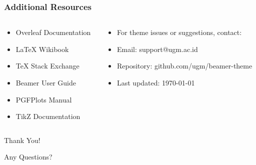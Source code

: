 \documentclass[aspectratio=169,professionalfonts]{beamer}
\begin{document}
\begin{frame}
    \frametitle{Additional Resources}
    
    \begin{columns}[T]
        \begin{column}{0.48\textwidth}
            \begin{tcolorbox}[colback=ugmLightGrey,colframe=ugmBlue,title=LaTeX Resources]
                \begin{itemize}
                    \item Overleaf Documentation
                    \item LaTeX Wikibook
                    \item TeX Stack Exchange
                    \item Beamer User Guide
                    \item PGFPlots Manual
                    \item TikZ Documentation
                \end{itemize}
            \end{tcolorbox}
        \end{column}
        
        \begin{column}{0.48\textwidth}
            \begin{tcolorbox}[colback=ugmLightGrey,colframe=ugmBlue,title=UGM Theme Contacts]
                \begin{itemize}
                    \item For theme issues or suggestions, contact:
                    \item Email: support@ugm.ac.id
                    \item Repository: github.com/ugm/beamer-theme
                    \item Last updated: \today
                \end{itemize}
            \end{tcolorbox}
        \end{column}
    \end{columns}
\end{frame}

\begin{frame}[plain]
    \begin{center}
        \Huge Thank You!
        
        \vspace{1em}
        
        \Large Any Questions?
    \end{center}
\end{frame}
\end{document}
